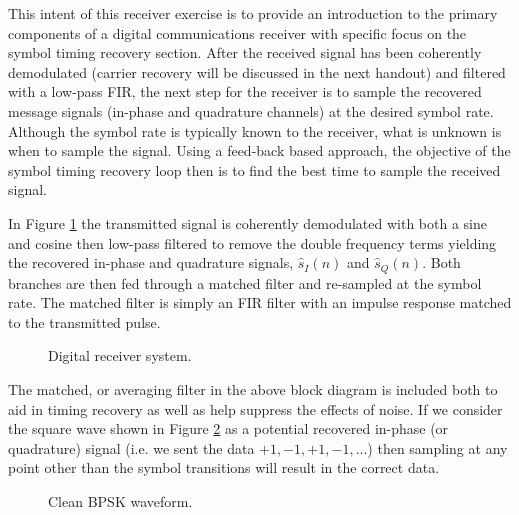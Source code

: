 This intent of this receiver exercise is to provide an introduction
to the primary components of a digital communications receiver
with specific focus on the symbol timing recovery section.
After the received signal has been coherently demodulated
(carrier recovery will be discussed in the next handout)
and filtered with a low-pass FIR, the next step for the
receiver is to sample the recovered message signals (in-phase
and quadrature channels) at the desired symbol rate.
Although the symbol rate is typically known to the receiver,
what is unknown is when to sample the signal.
Using a feed-back based approach, the objective of the symbol 
timing recovery loop then is to find the best time to sample the 
received signal. 
 

In Figure \ref{fig: receiver}
the transmitted signal is coherently demodulated
with both a sine and cosine then low-pass filtered
to remove the double frequency terms yielding the
recovered in-phase and quadrature signals, $\hat{s}_I(n)$ and
$\hat{s}_Q(n)$.  Both branches are then fed through
a matched filter and re-sampled at the symbol rate.
The matched filter is simply an FIR filter with an
impulse response matched to the transmitted pulse.

\begin{figure}[ht]
   \begin{center}
      \caption{Digital receiver system.}
      \label{fig: receiver}
   \end{center}
\end{figure}

The matched, or averaging filter in the above block diagram is included
both to aid in timing recovery as well as help suppress the effects of noise.  
If we consider the square wave shown in Figure \ref{fig: clean_BPSK} as a 
potential recovered in-phase (or quadrature) signal (i.e. we sent the
data $+1, -1, +1, -1, ...$) then sampling at any point
other than the symbol transitions will result in the correct
data.  
\begin{figure}[ht]
   \begin{center}
      \caption{Clean BPSK waveform.}
      \label{fig: clean_BPSK}
   \end{center}
\end{figure}

